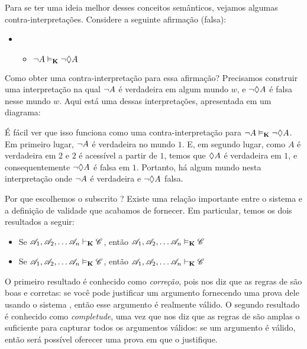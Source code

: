 Para se ter uma ideia melhor desses conceitos semânticos, vejamos algumas contra-interpretações. Considere a seguinte afirmação (falsa):

\begin{itemize}
	\item[]
	      \begin{itemize}
		      \item[]$\neg A\vDash_{\mathbf{K}} \neg \Diamond A$
	      \end{itemize}
\end{itemize}
Como obter uma contra-interpretação para essa afirmação? Precisamos construir uma interpretação na qual $\neg A$ é verdadeira em algum mundo $w$, e $\neg\Diamond A$ é falsa   nesse mundo $w$. Aqui está uma dessas interpretações, apresentada em um diagrama:
\begin{center}
\end{center}
É fácil ver que isso funciona como uma contra-interpretação para  $\neg A\vDash_{\mathbf{K}}\neg\Diamond A$. Em primeiro lugar, $\neg A$ é verdadeira no mundo $1$. 
E, em segundo lugar, como $A$ é verdadeira em $2$ e $2$ é acessível a partir de $1$, temos que $\Diamond A$ é verdadeira em $1$, e consequentemente $\neg\Diamond A$   é falsa em $1$. 
Portanto, há algum mundo nesta interpretação onde $\neg A$ é verdadeira e $\neg\Diamond A$  falsa.  

Por que escolhemos o subscrito \mlK? Existe uma relação importante entre o sistema \mlK{} e a definição de validade que acabamos de fornecer. Em particular, temos os dois resultados a seguir:
\begin{itemize}
	\item Se $\mathscr{A}_1,\mathscr{A}_2, \dots \mathscr{A}_n\vdash_{\mathbf{K}}\mathscr{C}$, então $\mathscr{A}_1,\mathscr{A}_2, \dots \mathscr{A}_n\vDash_{\mathbf{K}}\mathscr{C}$
	\item Se $\mathscr{A}_1,\mathscr{A}_2, \dots \mathscr{A}_n\vDash_{\mathbf{K}}\mathscr{C}$, então $\mathscr{A}_1,\mathscr{A}_2, \dots \mathscr{A}_n\vdash_{\mathbf{K}}\mathscr{C}$
\end{itemize}
O primeiro resultado é conhecido como \emph{correção}, pois nos diz que as regras de \mlK{} são boas e corretas: se você pode justificar um argumento fornecendo uma prova dele usando o sistema \mlK, então esse argumento é realmente válido. O segundo resultado é conhecido como    \emph{completude}, uma vez que nos diz que as regras de \mlK{} são amplas o suficiente para capturar todos os argumentos válidos: se um argumento é válido, então será possível oferecer uma prova em \mlK{} que o justifique.
 

